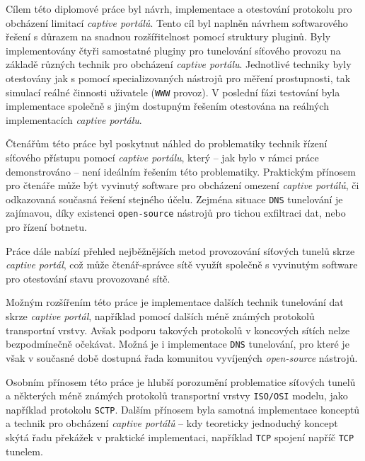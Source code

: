 \documentclass[thesis=M,czech]{FITthesis}[2012/10/20]
\begin{document}
\begin{conclusion}
	Cílem této diplomové práce byl návrh, implementace a otestování protokolu pro obcházení limitací \textit{captive portálů}. Tento cíl byl naplněn návrhem softwarového řešení s důrazem na snadnou rozšířitelnost pomocí struktury pluginů. Byly implementovány čtyři samostatné pluginy pro tunelování síťového provozu na základě různých technik pro obcházení \textit{captive portálu}. Jednotlivé techniky byly otestovány jak s pomocí specializovaných nástrojů pro měření prostupnosti, tak simulací reálné činnosti uživatele (\texttt{WWW} provoz). V poslední fázi testování byla implementace společně s jiným dostupným řešením otestována na reálných implementacích \textit{captive portálu}.
	
	Čtenářům této práce byl poskytnut náhled do problematiky technik řízení síťového přístupu pomocí \textit{captive portálu}, který -- jak bylo v rámci práce demonstrováno -- není ideálním řešením této problematiky. Praktickým přínosem pro čtenáře může být vyvinutý software pro obcházení omezení \textit{captive portálů}, či odkazovaná současná řešení stejného účelu. Zejména situace \texttt{DNS} tunelování je zajímavou, díky existenci \texttt{open-source} nástrojů pro tichou exfiltraci dat, nebo pro řízení botnetu.
	
	Práce dále nabízí přehled nejběžnějších metod provozování síťových tunelů skrze \textit{captive portál}, což může čtenář-správce sítě využít společně s vyvinutým software pro otestování stavu provozované sítě.
	
	Možným rozšířením této práce je implementace dalších technik tunelování dat skrze \textit{captive portál}, například pomocí dalších méně známých protokolů transportní vrstvy. Avšak podporu takových protokolů v koncových sítích nelze bezpodmínečně očekávat. Možná je i implementace \texttt{DNS} tunelování, pro které je však v současné době dostupná řada komunitou vyvíjených \textit{open-source} nástrojů.
	
	Osobním přínosem této práce je hlubší porozumění problematice síťových tunelů a některých méně známých protokolů transportní vrstvy \texttt{ISO/OSI} modelu, jako například protokolu \texttt{SCTP}. Dalším přínosem byla samotná implementace konceptů a technik pro obcházení \textit{captive portálů} -- kdy teoreticky jednoduchý koncept skýtá řadu překážek v praktické implementaci, například \texttt{TCP} spojení napříč \texttt{TCP} tunelem.
\end{conclusion}



\end{document}
